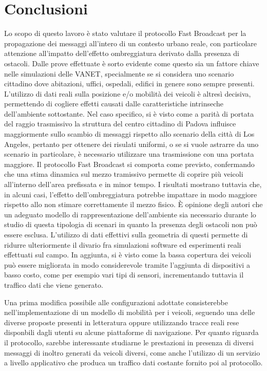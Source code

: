 
\chapter{Conclusioni}\label{chap:conclusioni}
Lo scopo di questo lavoro è stato valutare il protocollo Fast Broadcast per la propagazione dei messaggi
all'intero di un contesto urbano reale, con particolare attenzione all'impatto dell'effetto ombreggiatura derivato dalla
presenza di ostacoli.
Dalle prove effettuate è sorto evidente come questo sia un fattore chiave nelle simulazioni delle VANET,
specialmente se si considera uno scenario cittadino dove abitazioni, uffici, ospedali, edifici in genere sono sempre presenti.
L'utilizzo di dati reali sulla posizione e/o mobilità dei veicoli è altresì decisiva,
permettendo di cogliere effetti causati dalle caratteristiche intrinseche dell'ambiente sottostante.
Nel caso specifico, si è visto come a parità di portata del raggio trasmissivo la struttura
del centro cittadino di Padova influisce maggiormente sullo scambio di messaggi
rispetto allo scenario della città di Los Angeles,
pertanto per ottenere dei risulati uniformi, o se si vuole astrarre da uno scenario in particolare,
è necessario utilizzare una trasmissione con una portata maggiore.	%
Il protocollo Fast Broadcast si comporta come previsto, confermando che una stima dinamica sul mezzo
tramissivo permette di coprire più veicoli all'interno dell'area prefissata e in minor tempo.
I risultati mostrano tuttavia che, in alcuni casi, l'effetto dell'ombreggiatura
potrebbe impattare in modo maggiore rispetto allo non stimare correttamente il mezzo fisico. %
È opinione degli autori che un adeguato modello di rappresentazione dell'ambiente sia
necessario durante lo studio di questa tipologia di scenari in quanto la presenza degli ostacoli non può essere esclusa.
L'utilizzo di dati effettivi sulla geometria di questi permette di ridurre ulteriormente il divario fra simulazioni software
ed esperimenti reali effettuati sul campo.
In aggiunta, si è visto come la bassa copertura dei veicoli può essere migliorata in modo considerevole tramite l'aggiunta
di dispositivi a basso costo, come per esempio vari tipi di sensori, incrementando tuttavia il traffico dati che viene generato.

Una prima modifica possibile alle configurazioni adottate consisterebbe
nell'implementazione di un modello di mobilità per i veicoli,
seguendo una delle diverse proposte presenti in letteratura
oppure utilizzando tracce reali rese disponbili dagli utenti su alcune piattaforme di navigazione.
Per quanto riguarda il protocollo, sarebbe interessante studiarne
le prestazioni in presenza di diversi messaggi di inoltro generati da veicoli diversi,
come anche l'utilizzo di un servizio a livello applicativo che produca un traffico dati costante
fornito poi al protocollo.

